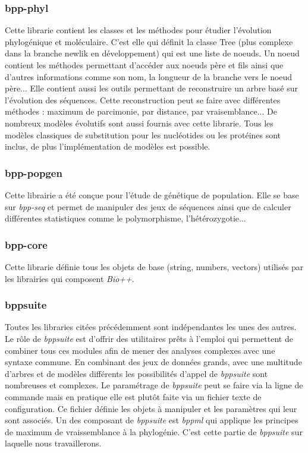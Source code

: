 	\subsubsection*{bpp-phyl}
	Cette librarie contient les classes et les méthodes pour étudier l'évolution phylogénique et moléculaire. C'est elle qui définit la classe Tree (plus complexe dans la branche newlik en développement) qui est une liste de noeuds. Un noeud contient les méthodes permettant d'accéder aux noeuds père et fils ainsi que d'autres informations comme son nom, la longueur de la branche vers le noeud père...
	Elle contient aussi les outils permettant de reconstruire un arbre basé sur l'évolution des séquences. Cette reconstruction peut se faire avec différentes méthodes : maximum de parcimonie, par distance, par vraisemblance...
	De nombreux modèles évolutifs sont aussi fournis avec cette librarie. Tous les modèles classiques de substitution pour les nucléotides ou les protéines sont inclus, de plus l'implémentation de modèles est possible.
	\subsubsection*{bpp-popgen}
	Cette librairie a été conçue pour l'étude de génétique de population. Elle se base sur \textit{bpp-seq} et permet de manipuler des jeux de séquences ainsi que de calculer différentes statistiques comme le polymorphisme, l'hétérozygotie...
	
	\subsubsection*{bpp-core}
	Cette librarie définie tous les objets de base (string, numbers, vectors) utilisés par les librairies qui composent \textit{Bio++}.
	
	\subsubsection*{bppsuite}
	Toutes les libraries citées précédemment sont indépendantes les unes des autres. Le rôle de \textit{bppsuite} est d'offrir des utilitaires prêts à l'emploi qui permettent de combiner tous ces modules afin de mener des analyses complexes avec une syntaxe commune. En combinant des jeux de données grands, avec une multitude d'arbres et de modèles différents les possibilités d'appel de \textit{bppsuite} sont nombreuses et complexes. Le paramétrage de \textit{bppsuite} peut se faire via la ligne de commande mais en pratique elle est plutôt faite via un fichier texte de configuration. Ce fichier définie les objets à manipuler et les paramètres qui leur sont associés.
	Un des composant de \textit{bppsuite} est \textit{bppml} qui applique les principes de maximum de vraissemblance à la phylogénie. C'est cette partie de \textit{bppsuite} sur laquelle nous travaillerons.
	
